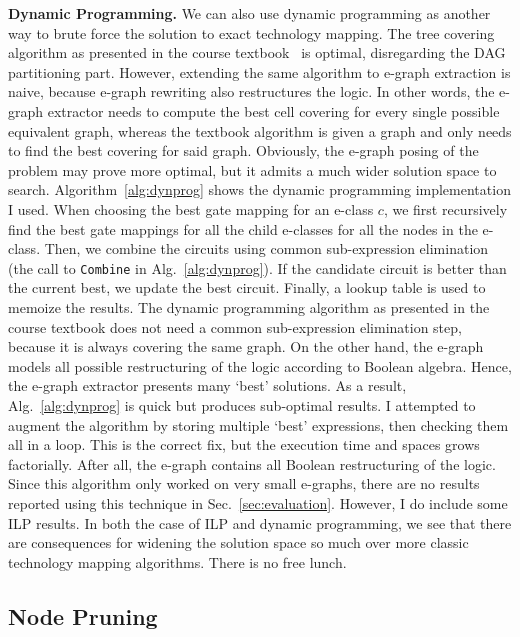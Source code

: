\documentclass[10pt,letterpaper]{article}
\begin{document}
\bigbreak{} \noindent \textbf{Dynamic
    Programming.} We can also use dynamic programming as another way to brute force the solution
to exact technology mapping. The tree covering algorithm as presented in the
course textbook~\cite{coursebook} is optimal, disregarding the DAG partitioning
part. However, extending the same algorithm to e-graph extraction is naive,
because e-graph rewriting also restructures the logic. In other words, the
e-graph extractor needs to compute the best cell covering for every single
possible equivalent graph, whereas the textbook algorithm is given a graph and
only needs to find the best covering for said graph. Obviously, the e-graph
posing of the problem may prove more optimal, but it admits a much wider
solution space to search. Algorithm~\ref{alg:dynprog} shows the dynamic
programming implementation I used. When choosing the best gate mapping for an
e-class $c$, we first recursively find the best gate mappings for all the child
e-classes for all the nodes in the e-class. Then, we combine the circuits using
common sub-expression elimination (the call to \texttt{Combine} in
Alg.~\ref{alg:dynprog}). If the candidate circuit is better than the current
best, we update the best circuit. Finally, a lookup table is used to memoize
the results. The dynamic programming algorithm as presented in the course
textbook does not need a common sub-expression elimination step, because it is
always covering the same graph. On the other hand, the e-graph models all
possible restructuring of the logic according to Boolean algebra. Hence, the
e-graph extractor presents many `best' solutions. As a result,
Alg.~\ref{alg:dynprog} is quick but produces sub-optimal results. I attempted to
augment the algorithm by storing multiple `best' expressions, then checking
them all in a loop. This is the correct fix, but the execution time and spaces
grows factorially. After all, the e-graph contains all Boolean restructuring of
the logic. Since this algorithm only worked on very small e-graphs, there are
no results reported using this technique in Sec.~\ref{sec:evaluation}. However,
I do include some ILP results. In both the case of ILP and dynamic programming,
we see that there are consequences for widening the solution space so much over
more classic technology mapping algorithms. There is no free lunch.

\subsection{Node Pruning}\label{sec:alt:pruning}
\end{document}
